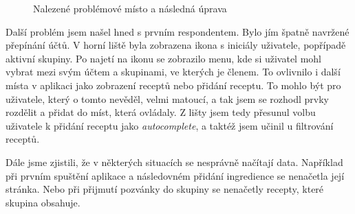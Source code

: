 \begin{figure}[H]
    \centering
    \hfill
    \caption{Nalezené problémové místo a následná úprava}
\end{figure}

Další problém jsem našel hned s prvním respondentem. Bylo jím špatně navržené přepínání účtů. V horní liště byla zobrazena ikona s iniciály uživatele,
popřípadě aktivní skupiny. Po najetí na ikonu se zobrazilo menu, kde si uživatel mohl vybrat mezi svým účtem a skupinami, ve kterých je členem. To
ovlivnilo i další místa v aplikaci jako zobrazení receptů nebo přidání receptu. To mohlo být pro uživatele, který o tomto nevěděl, velmi matoucí, a
tak jsem se rozhodl prvky rozdělit a přidat do míst, která ovládaly. Z lišty jsem tedy přesunul volbu uživatele k přidání receptu jako \emph{autocomplete},
a taktéž jsem učinil u filtrování receptů.

Dále jsme zjistili, že v některých situacích se nesprávně načítají data. Například při prvním spuštění aplikace a následovném přidání ingredience
se nenačetla její stránka. Nebo při přijmutí pozvánky do skupiny se nenačetly recepty, které skupina obsahuje.

